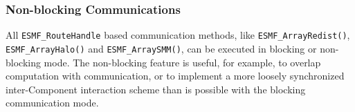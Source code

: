  
\setlength{\oldparskip}{\parskip}
\setlength{\parskip}{1.5ex}
\setlength{\oldparindent}{\parindent}
\setlength{\parindent}{0pt}
\setlength{\oldbaselineskip}{\baselineskip}
\setlength{\baselineskip}{11pt}
 
\def\bv{\begin{verbatim}}
\def\ev{\end{verbatim}}
\def\be{\begin{equation}}
\def\ee{\end{equation}}
\def\bea{\begin{eqnarray}}
\def\eea{\end{eqnarray}}
\def\bi{\begin{itemize}}
\def\ei{\end{itemize}}
\def\bn{\begin{enumerate}}
\def\en{\end{enumerate}}
\def\bd{\begin{description}}
\def\ed{\end{description}}
\def\({\left (}
\def\){\right )}
\def\[{\left [}
\def\]{\right ]}
\def\<{\left  \langle}
\def\>{\right \rangle}
\def\cI{{\cal I}}
\def\diag{\mathop{\rm diag}}
\def\tr{\mathop{\rm tr}}


 

  
   \subsubsection{Non-blocking Communications}
   \label{Array:CommNB}
   
   All {\tt ESMF\_RouteHandle} based communication methods, like 
   {\tt ESMF\_ArrayRedist()}, {\tt ESMF\_ArrayHalo()} and {\tt ESMF\_ArraySMM()}, 
   can be executed in blocking or non-blocking mode. The non-blocking feature is
   useful, for example, to overlap computation with communication, or to
   implement a more loosely synchronized inter-Component interaction scheme than
   is possible with the blocking communication mode.
  
